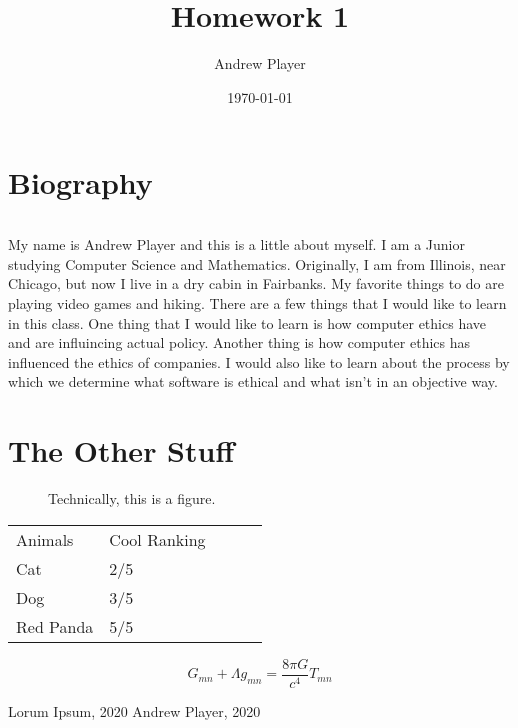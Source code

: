 \documentclass[12pt]{article}
\title{Homework 1}
\author{Andrew Player}
\date{\today}
\theoremstyle{homework}
\begin{document}
\maketitle

\section{Biography}
\begin{verbatim}
\end{verbatim}
My name is Andrew Player and this is a little about myself. I am a Junior studying Computer Science 
and Mathematics. Originally, I am from Illinois, near Chicago, but now
 I live in a dry cabin in Fairbanks. My favorite things to do are playing
 video games and hiking. 
\newline
\newline
There are a few things that I would like to learn in this class. One thing
that I would like to learn is how computer ethics have and are influincing 
actual policy. Another thing is how computer ethics has influenced the ethics
of companies. I would also like to learn about the process by which we determine
what software is ethical and what isn't in an objective way. \cite[100]{lipsum}
\newline
\newline
\section{The Other Stuff}
\begin{figure}[h]
  Technically, this is a figure.
\end{figure}
\begin{table}[h]
\begin{tabular}{lllll}
Animals   & Cool Ranking &  &  &  \\
Cat       & 2/5          &  &  &  \\
Dog       & 3/5          &  &  &  \\
Red Panda & 5/5          &  &  & 
\end{tabular}
\end{table}
\begin{equation}
G_{mn} + \Lambda g_{mn} = \frac{8\pi G}{c^{4}}T_{mn}
\end{equation}
\begin{thebibliography}{9}
Lorum Ipsum, 2020
Andrew Player, 2020
\end{thebibliography}
\end{document}
